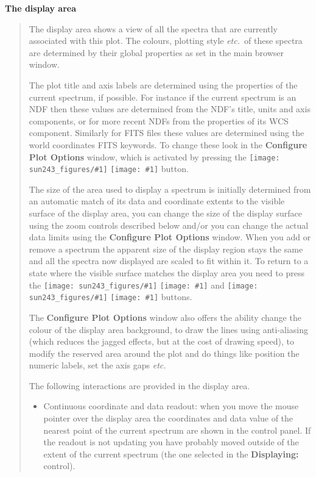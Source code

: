 \documentclass[twoside,11pt,nolof]{starlink}
\providecommand{\inline}[1]
        {\ifpdf
          \texttt{[image: sun243\_figures/\#1]}
          \else
          \texttt{[image: \#1]}
          \fi
        }
\newcommand{\labelitem}[1]{\textbf{#1}}
\providecommand{\etc}{\textit{etc.}}
\providecommand{\subheading}[1]{\textbf{\large{#1}}}
\begin{document}
\subheading{The display area}
\begin{quote}
 The display area shows a view of all the spectra that are currently
 associated with this plot. The colours, plotting style \etc\ of these
 spectra are determined by their global properties as set in the main
 browser window.

 The plot title and axis labels are determined using the properties of the
 current spectrum, if possible. For instance if the current spectrum is an NDF
 then these values are determined from the NDF's title, units and axis
 components, or for more recent NDFs from the properties of its WCS
 component. Similarly for FITS files these values are determined using the
 world coordinates FITS keywords. To change these look in the
 \labelitem{Configure Plot Options} window, which is activated by pressing the
 \inline{config} button.

 The size of the area used to display a spectrum is initially determined from
 an automatic match of its data and coordinate extents to the visible surface
 of the display area, you can change the size of the display surface using the
 zoom controls described below and/or you can change the actual data limits
 using the \labelitem{Configure Plot Options} window. When you add or remove a
 spectrum the apparent size of the display region stays the same and all the
 spectra now displayed are scaled to fit within it. To return to a state where
 the visible surface matches the display area you need to press the
 \inline{fitwidth} and \inline{fitheight} buttons.

 The \labelitem{Configure Plot Options} window also offers the ability change
 the colour of the display area background, to draw the lines using
 anti-aliasing (which reduces the jagged effects, but at the cost of drawing
 speed), to modify the reserved area around the plot and do things like
 position the numeric labels, set the axis gaps \etc\

 The following interactions are provided in the display area.
 \begin{itemize}

  \item Continuous coordinate and data readout: when you move the mouse
  pointer over the display area the coordinates and data value of the nearest
  point of the current spectrum are shown in the control panel.  If the
  readout is not updating you have probably moved outside of the extent of the
  current spectrum (the one selected in the \labelitem{Displaying:} control).


\end{itemize}
\end{quote}
\end{document}
